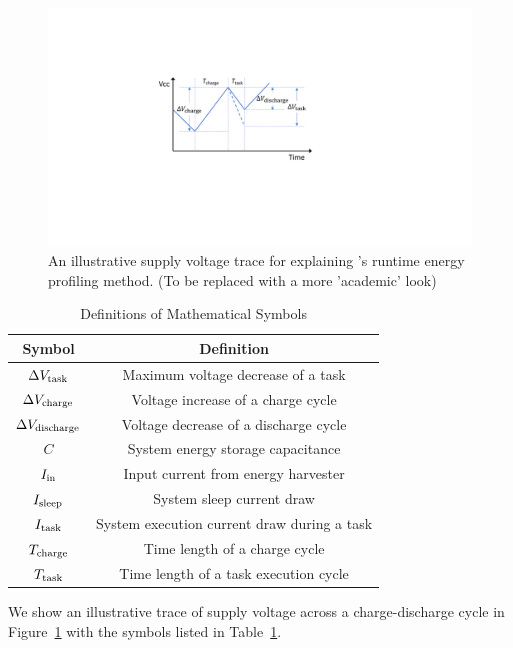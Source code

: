 \begin{figure}[!t]
    \centering
    \includegraphics[width=\columnwidth]{ch5_optic/figures/temp.pdf}
    \caption{An illustrative supply voltage trace for explaining \nn{}'s runtime energy profiling method. (To be replaced with a more 'academic' look) }
    \label{fig:math}
\end{figure}

\begin{table}[!t]
    \renewcommand{\arraystretch}{1.2}
    \centering
    \caption{Definitions of Mathematical Symbols}
    \label{tab:symbols}
    \begin{tabular}{|c|c|}
    \hline
    \textbf{Symbol} & \textbf{Definition} \\
    \hline
    $\Delta V_{\text{task}}$ & Maximum voltage decrease of a task \\
    $\Delta V_{\text{charge}}$ & Voltage increase of a charge cycle \\
    $\Delta V_{\text{discharge}}$ & Voltage decrease of a discharge cycle \\
    $C$ & System energy storage capacitance \\
    $I_{\text{in}}$ & Input current from energy harvester \\
    $I_{\text{sleep}}$ & System sleep current draw \\
    $I_{\text{task}}$ & System execution current draw during a task \\
    $T_{\text{charge}}$ & Time length of a charge cycle  \\
    $T_{\text{task}}$ & Time length of a task execution cycle  \\
    \hline
    \end{tabular}
\end{table}

We show an illustrative trace of supply voltage across a charge-discharge cycle in Figure~\ref{fig:math} with the symbols listed in Table~\ref{tab:symbols}. 

